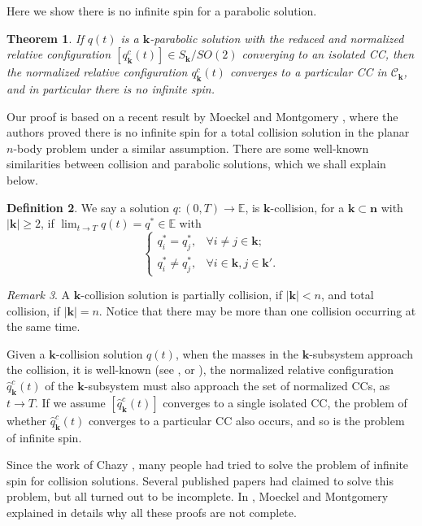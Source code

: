 \documentclass[11pt]{amsart}
\newtheorem{theorem}{Theorem}[section]
\theoremstyle{definition}
\newtheorem{definition}[theorem]{Definition}
\theoremstyle{remark}
\newtheorem{remark}[theorem]{Remark}
\numberwithin{equation}{section}
\newcommand{\be}{\mathbb E}
\newcommand{\bn}{\mathbf n}
\newcommand{\bk}{\mathbf k}
\begin{document}
Here we show there is no infinite spin for a parabolic solution. 
\begin{theorem}
	\label{them;no-spin-para} If $q(t)$ is a $\bk$-parabolic solution with the reduced and normalized relative configuration $[q^c_{\bk}(t)] \in S_{\bk}/SO(2)$ converging to an isolated CC, then the normalized relative configuration $q^c_{\bk}(t)$ converges to a particular CC in $\mathscr{C}_{\bk}$, and in particular there is no infinite spin. 
\end{theorem}

Our proof is based on a recent result by Moeckel and Montgomery \cite{MM25}, where the authors proved there is no infinite spin for a total collision solution in the planar $n$-body problem under a similar assumption. There are some well-known similarities between collision and parabolic solutions, which we shall explain below. 

\begin{definition}
	\label{df;par-coll} We say a solution $q: (0, T) \to \be$, is $\bk$-collision, for a $\bk \subset \bn$ with $|\bk| \ge 2$, if $\lim_{t \to T} q(t) = q^* \in \be$ with 
	$$ \begin{cases}
		q^*_i = q^*_j, & \forall i \ne j \in \bk; \\
		q^*_i \ne q^*_j, & \forall i \in \bk, j \in \bk'. 
	\end{cases}
     $$
\end{definition}
\begin{remark}
	A $\bk$-collision solution is partially collision, if $|\bk| < n$, and total collision, if $|\bk|= n$. Notice that there may be more than one collision occurring at the same time. 
\end{remark}

Given a $\bk$-collision solution $q(t)$, when the masses in the $\bk$-subsystem approach the collision, it is well-known (see \cite{Chazy18}, \cite{Wt41} or \cite{FT04}), the normalized relative configuration $\hat{q}^c_{\bk}(t)$ of the $\bk$-subsystem must also approach the set of normalized CCs, as $t \to T$. If we assume $[\hat{q}^c_{\bk}(t)]$ converges to a single isolated CC, the problem of whether $\hat{q}^c_{\bk}(t)$ converges to a particular CC also occurs, and so is the problem of infinite spin. 

Since the work of Chazy \cite{Chazy18}, many people had tried to solve the problem of infinite spin for collision solutions. Several published papers had claimed to solve this problem, but all turned out to be incomplete. In \cite{MM25}, Moeckel and Montgomery explained in details why all these proofs are not complete. 
\end{document}
